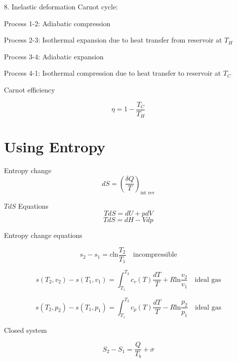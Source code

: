 \documentclass[paper=letter, fontsize=11pt]{scrartcl}
\numberwithin{equation}{section}        %
\numberwithin{figure}{section}          %
\numberwithin{table}{section}               %
\begin{document}
8. Inelastic deformation
\newline
\newline
Carnot cycle:

Process 1-2: Adiabatic compression

Process 2-3: Isothermal expansion due to heat transfer from reservoir at $T_H$

Process 3-4: Adiabatic expansion

Process 4-1: Isothermal compression due to heat transfer to reservoir at $T_C$

Carnot efficiency

\begin{equation}
    \eta = 1 - \frac{T_C}{T_H}
\end{equation}

\section{Using Entropy}

Entropy change
\begin{equation}
    d S = \left(\frac{\delta Q}{T}\right)_\text{int rev}
\end{equation}

$TdS$ Equations
\begin{equation}
    T dS = dU + p dV
\end{equation}
\begin{equation}
    T dS = dH - V dp
\end{equation}

Entropy change equations

\begin{equation}
    s_2-s_1 = c \text{ln}\frac{T_2}{T_1}\quad\text{incompressible}
\end{equation}

\begin{equation}
    s(T_2,v_2)-s(T_1,v_1) = \int_{T_1}^{T_2}c_v(T)\frac{dT}{T} + R \text{ln}\frac{v_2}{v_1}  \quad\text{ideal gas}
\end{equation}

\begin{equation}
    s(T_2,p_2)-s(T_1,p_1) = \int_{T_1}^{T_2}c_p(T)\frac{dT}{T} - R \text{ln}\frac{p_2}{p_1}  \quad\text{ideal gas}
\end{equation}

Closed system

\begin{equation}
    S_2-S_1 = \frac{Q}{T_b}+\sigma
\end{equation}
\end{document}

